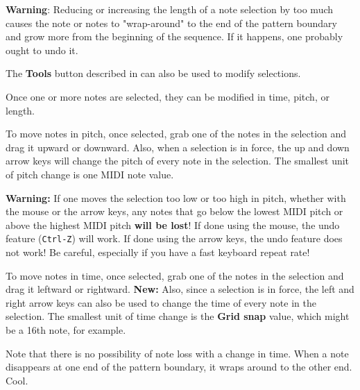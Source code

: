    \textbf{Warning}:  Reducing or increasing the length of a note selection
   by too much causes the note or notes to "wrap-around" to the end
   of the pattern boundary and grow more from the beginning of the sequence. 
   If it happens, one probably ought to undo it.

   The \textbf{Tools} button described in
    can also be used to
   modify selections.

   Once one or more notes are selected, they can be modified in time,
   pitch, or length.

   To move notes in pitch, once selected, grab one of the notes in the
   selection and drag it upward or downward.
   Also, when a selection is in force, the up and down arrow keys will
   change the pitch of every note in the selection.
   The smallest unit of pitch change is one MIDI note value.

   \textbf{Warning:}
   If one moves the selection too low or too high in pitch, whether with the
   mouse or the arrow keys, any notes that go below the lowest MIDI pitch or
   above the highest MIDI pitch \textbf{will be lost}!
   If done using the mouse, the undo feature (\texttt{Ctrl-Z}) will work.
   If done using the arrow keys, the undo feature does not work!
   Be careful, especially if you have a fast keyboard repeat rate!

   To move notes in time, once selected, grab one of the notes in the
   selection and drag it leftward or rightward.
   \textbf{New:}
   Also, since a selection is in force, the left and right arrow keys can also
   be used to change the time of every note in the selection.
   The smallest unit of time change is the \textbf{Grid snap} value,
   which might be a 16th note, for example.

   Note that there is no possibility of note loss with a change in time.  When
   a note disappears at one end of the pattern boundary, it wraps around to the
   other end.  Cool.



